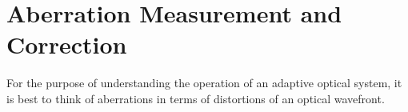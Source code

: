 \section{Aberration Measurement and Correction}
\label{Measurement}


For the purpose of understanding the operation of an adaptive optical system, 
it is best to think of aberrations in terms of distortions of an optical 
wavefront.

